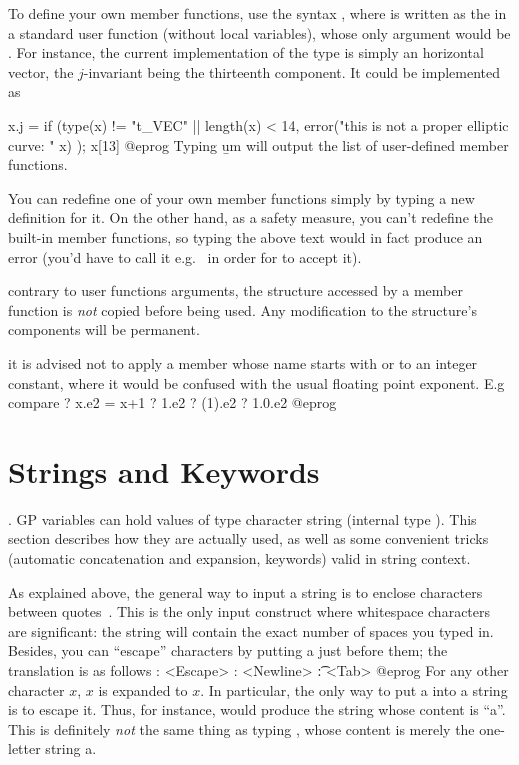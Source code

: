 To define your own member functions, use the syntax , where  is written as the  in a
standard user function (without local variables), whose only argument would
be . For instance, the current implementation of the 
type is simply an horizontal vector, the $j$-invariant being the thirteenth
component. It could be implemented as

\bprog
x.j =
{
  if (type(x) != "t_VEC" || length(x) < 14,
    error("this is not a proper elliptic curve: " x)
  );
  x[13]
}
@eprog\noindent
Typing \b{um} will output the list of user-defined member functions.

You can redefine one of your own member functions simply by typing a new
definition for it. On the other hand, as a safety measure, you can't redefine
the built-in member functions, so typing the above text would in fact produce
an error (you'd have to call it e.g.~ in order for  to
accept it).

 contrary to user functions arguments, the structure
accessed by a member function is \emph{not} copied before being used.
Any modification to the structure's components will be permanent.

 it is advised not to apply a member whose name
starts with  or  to an integer constant, where it would be
confused with the usual floating point exponent. E.g compare
\bprog
  ? x.e2 = x+1
  ? 1.e2
  ? (1).e2
  ? 1.0.e2
@eprog

\section{Strings and Keywords}
\label{se:strings}

. GP variables can hold values of type character string
(internal type ). This section describes how they are actually used,
as well as some convenient tricks (automatic concatenation and expansion,
keywords) valid in string context.

As explained above, the general way to input a string is to enclose
characters between quotes~. This is the only input construct where
whitespace characters are significant: the string will contain the exact
number of spaces you typed in. Besides, you can ``escape'' characters by
putting a \kbd{\bs} just before them; the translation is as follows
\bprog
   \e: <Escape>
   \n: <Newline>
   \t: <Tab>
@eprog
For any other character $x$, \b{$x$} is expanded to $x$. In particular, the
only way to put a  into a string is to escape it. Thus, for
instance,  would produce the string whose content is
``a''. This is definitely \emph{not} the same thing as typing ,
whose content is merely the one-letter string a.

